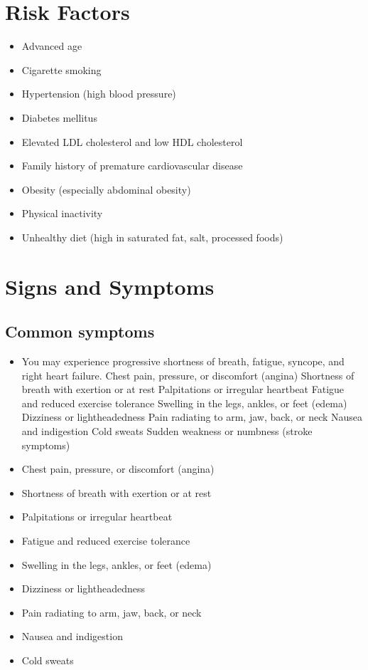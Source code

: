 \section{Risk Factors}


\begin{itemize}[noitemsep]
  \item Advanced age
  \item Cigarette smoking
  \item Hypertension (high blood pressure)
  \item Diabetes mellitus
  \item Elevated LDL cholesterol and low HDL cholesterol
  \item Family history of premature cardiovascular disease
  \item Obesity (especially abdominal obesity)
  \item Physical inactivity
  \item Unhealthy diet (high in saturated fat, salt, processed foods)
\end{itemize}
\section{Signs and Symptoms}

\subsection{Common symptoms}
\begin{itemize}[noitemsep]
  \item You may experience progressive shortness of breath, fatigue, syncope, and right heart failure. Chest pain, pressure, or discomfort (angina) Shortness of breath with exertion or at rest Palpitations or irregular heartbeat Fatigue and reduced exercise tolerance Swelling in the legs, ankles, or feet (edema) Dizziness or lightheadedness Pain radiating to arm, jaw, back, or neck Nausea and indigestion Cold sweats Sudden weakness or numbness (stroke symptoms)
  \item Chest pain, pressure, or discomfort (angina)
  \item Shortness of breath with exertion or at rest
  \item Palpitations or irregular heartbeat
  \item Fatigue and reduced exercise tolerance
  \item Swelling in the legs, ankles, or feet (edema)
  \item Dizziness or lightheadedness
  \item Pain radiating to arm, jaw, back, or neck
  \item Nausea and indigestion
  \item Cold sweats
\end{itemize}

